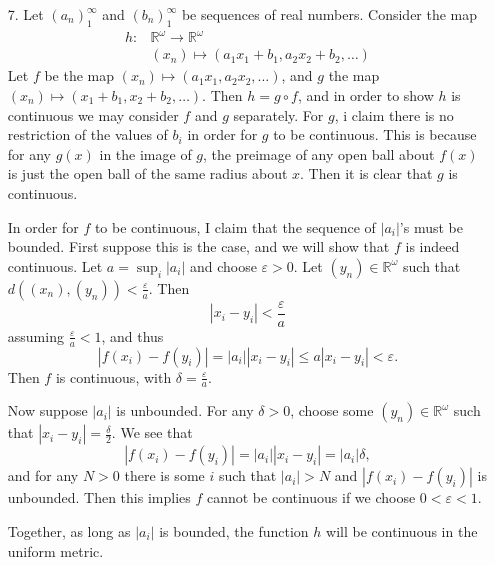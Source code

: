 \documentclass[11pt, reqno]{article}
\theoremstyle{plain}
\theoremstyle{definition}
\theoremstyle{remark}
\renewcommand{\epsilon}{\varepsilon}
\newcommand{\RR}{\mathbb{R}}
\begin{document}
\begin{enumerate}
    \item[7.] Let $(a_n)_1^\infty$ and $(b_n)_1^\infty$ be sequences of real numbers. Consider the map
    \begin{align*}
        h: & \RR^\omega \rightarrow \RR^\omega\\
        & (x_n) \mapsto (a_1 x_1 + b_1, a_2 x_2 + b_2, \dots)
    \end{align*}
    Let $f$ be the map $(x_n) \mapsto (a_1 x_1, a_2 x_2, \dots)$, and $g$ the map $(x_n) \mapsto (x_1 + b_1, x_2 + b_2,\dots)$.
    Then $h = g \circ f$, and in order to show $h$ is continuous we may consider $f$ and $g$ separately.
    \bigbreak
    For $g$, i claim there is no restriction of the values of $b_i$ in order for $g$ to be continuous. This 
    is because for any $g(x)$ in the image of $g$, the preimage of any open ball about $f(x)$ is just the open ball
    of the same radius about $x$. Then it is clear that $g$ is continuous.

    In order for $f$ to be continuous, I claim that the sequence of $|a_i|$'s must be bounded. First suppose this is 
    the case, and we will show that $f$ is indeed continuous. Let $a = \sup_i |a_i|$ and choose $\epsilon > 0$. 
    Let $(y_n) \in \RR^\omega$ such that $d((x_n), (y_n)) < \frac{\epsilon}{a}$. Then 
    \[
        |x_i - y_i| < \frac{\epsilon}{a}
    \]
    assuming $\frac{\epsilon}{a} < 1$, and thus 
    \[
        |f(x_i) - f(y_i)| = |a_i||x_i - y_i| \leq a|x_i - y_i| < \epsilon.
    \]
    Then $f$ is continuous, with $\delta = \frac{\epsilon}{a}$.

    Now suppose $|a_i|$ is unbounded. For any $\delta > 0$, choose some $(y_n) \in \RR^\omega$
    such that $|x_i - y_i| = \frac{\delta}{2}$. We see that 
    \[
        |f(x_i) - f(y_i)| = |a_i||x_i - y_i| = |a_i|\delta,
    \]
    and for any $N > 0$ there is some $i$ such that $|a_i| > N$ and $|f(x_i) - f(y_i)|$ is unbounded. Then 
    this implies $f$ cannot be continuous if we choose $0 < \epsilon < 1$.

    Together, as long as $|a_i|$ is bounded, the function $h$ will be continuous in the uniform metric. 


\end{enumerate}
\end{document}
